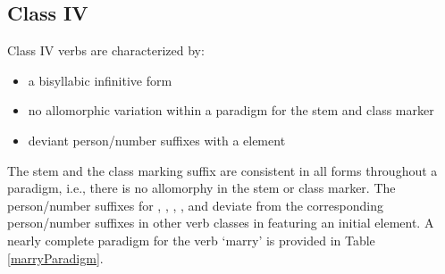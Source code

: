 \subsection{Class IV}\label{VclassIV}
Class IV verbs are characterized by: 
\begin{itemize}
\item{a bisyllabic infinitive form}
\item{no allomorphic variation within a paradigm for the stem and class marker}
\item{deviant person/number suffixes with a  element}
\end{itemize}
The stem and the class marking suffix are consistent in all forms throughout a paradigm, i.e., there is no allomorphy in the stem or class marker. 
The person/number suffixes for , , , ,  and  deviate from the corresponding person/number suffixes in other verb classes in featuring an initial  element. 
A nearly complete paradigm for the verb  ‘marry’ is provided in Table \vref{marryParadigm}.
